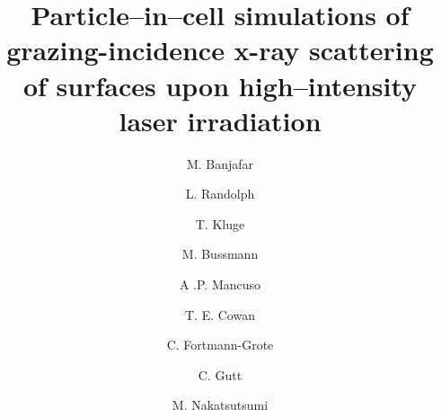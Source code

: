\documentclass[preprint, 12pt]{elsarticle}
\begin{document}
\begin{frontmatter}



\title{Particle--in--cell simulations of grazing-incidence x-ray scattering of
surfaces upon high--intensity laser irradiation}





\author[1]{M. Banjafar}
\author[2]{L. Randolph}
\author[3]{T. Kluge}
\author[3]{M. Bussmann}
\author[1]{A .P. Mancuso}
\author[3]{T. E. Cowan}
\author[1]{C. Fortmann-Grote}
\author[2]{C. Gutt}
\author[1]{M. Nakatsutsumi}
%
\address[1]{European XFEL GmbH, Holzkoppel 4, 22869 Schenefeld, Germany}
\address[2]{Department of Physics, University of Siegen, D-57072 Siegen, Germany}
\address[3]{Helmholtz-Zentrum Dresden-Rossendorf, Bautzner Landstraße 400, 01328 Dresden, Germany}


\end{frontmatter}
\end{document}
